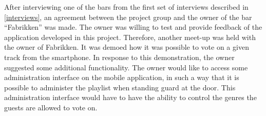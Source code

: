 After interviewing one of the bars from the first set of interviews described in \cref{interviews}, an agreement between the project group and the owner of the bar \enquote{Fabrikken} was made. The owner was willing to test and provide feedback of the application developed in this project. Therefore, another meet-up was held with the owner of Fabrikken. It was demoed how it was possible to vote on a given track from the smartphone. In response to this demonstration, the owner suggested some additional functionality. The owner would like to access some administration interface on the mobile application, in such a way that it is possible to administer the playlist when standing guard at the door. This administration interface would have to have the ability to control the genres the guests are allowed to vote on.
